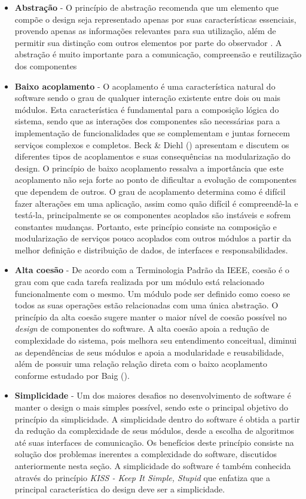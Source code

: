 \begin{itemize}
\item \textbf{Abstração} - O princípio de abstração recomenda que um elemento que compõe o design seja representado apenas por suas características essenciais, provendo apenas as informações relevantes  para sua utilização, além de permitir sua distinção com outros elementos por parte do observador \cite{germoglio2009}. A abstração é muito importante para a comunicação, compreensão e reutilização dos componentes
\item \textbf{Baixo acoplamento} - O acoplamento é uma característica natural do software sendo o grau de qualquer interação existente entre dois ou mais módulos. Esta característica é fundamental para a composição lógica do sistema, sendo que as interações dos componentes são necessárias para a implementação de funcionalidades que se complementam e juntas fornecem serviços complexos e completos. Beck \& Diehl (\citeyear{diehl2011}) apresentam e discutem os diferentes tipos de acoplamentos e suas consequências na modularização do design. O princípio de baixo acoplamento ressalva a importância que este acoplamento não seja forte ao ponto de dificultar a evolução de componentes que dependem de outros. O grau de acoplamento determina como é difícil fazer alterações em uma aplicação, assim como quão difícil é compreendê-la e testá-la, principalmente se os componentes acoplados são instáveis e sofrem constantes mudanças. Portanto, este princípio consiste na composição e modularização de serviços pouco acoplados com outros módulos a partir da melhor definição e distribuição de dados, de interfaces e responsabilidades.
\item \textbf{Alta coesão} - De acordo com a Terminologia Padrão da IEEE, coesão é o grau com que cada tarefa realizada por um módulo está relacionado funcionalmente com o mesmo. Um módulo pode ser definido como coeso se todos as suas operações estão relacionadas com uma única abstração.  O princípio da alta coesão sugere manter o maior nível de coesão possível no \emph{design} de componentes do software. A alta coesão apoia a redução de complexidade do sistema, pois melhora seu entendimento conceitual, diminui as dependências de seus módulos e apoia a modularidade e reusabilidade, além de possuir uma relação relação direta com o baixo acoplamento conforme estudado por Baig (\citeyear{baig2004}).
\item \textbf{Simplicidade} - Um dos maiores desafios no desenvolvimento de software é manter o design o mais simples possível, sendo este o principal objetivo do princípio da simplicidade. A simplicidade dentro do software é obtida a partir da redução da complexidade de seus módulos, desde a escolha de algoritmos até suas interfaces de comunicação. Os benefícios deste princípio consiste na solução dos problemas inerentes a complexidade do software, discutidos anteriormente nesta seção. A simplicidade do software é também conhecida através do princípio \emph{KISS - Keep It Simple, Stupid} que enfatiza que a principal característica do design deve ser a simplicidade.
\end{itemize}

